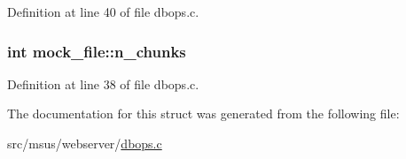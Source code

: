 Definition at line 40 of file dbops.\-c.

\hypertarget{structmock__file_a18485ea7673b7336615d1a47ce8169eb}{
\subsubsection[{n\-\_\-chunks}]{\setlength{\rightskip}{0pt plus 5cm}int mock\-\_\-file\-::n\-\_\-chunks}}\label{structmock__file_a18485ea7673b7336615d1a47ce8169eb}


Definition at line 38 of file dbops.\-c.



The documentation for this struct was generated from the following file\-:\begin{DoxyCompactItemize}
\item 
src/msus/webserver/\hyperlink{dbops_8c}{dbops.\-c}\end{DoxyCompactItemize}
